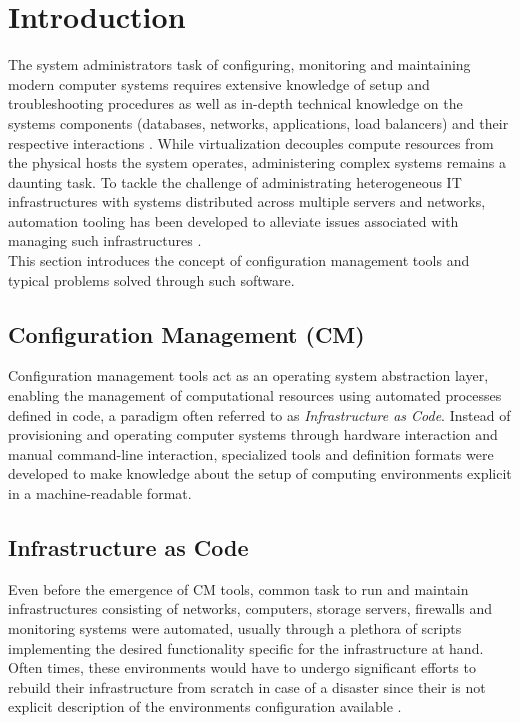 \section{Introduction}

	The system administrators task of configuring, monitoring and maintaining modern computer systems requires extensive knowledge of setup and troubleshooting procedures as well as in-depth technical knowledge on the systems components (databases, networks, applications, load balancers) and their respective interactions \cite{Barrett:2004:FSC:1031607.1031672}. While virtualization decouples compute resources from the physical hosts the system operates, administering complex systems remains a daunting task. To tackle the challenge of administrating heterogeneous IT infrastructures with systems distributed across multiple servers and networks, automation tooling has been developed to alleviate issues associated with managing such infrastructures \cite{Hintsch2016ARO}. \\ This section introduces the concept of configuration management tools and typical problems solved through such software.

\subsection{Configuration Management (CM)}

Configuration management tools act as an operating system abstraction layer, enabling the management of computational resources using automated processes defined in code, a paradigm often referred to as \textit{Infrastructure as Code}. Instead of provisioning and operating computer systems through hardware interaction and manual command-line interaction, specialized tools and definition formats were developed to make knowledge about the setup of computing environments explicit in a machine-readable format.

\subsection{Infrastructure as Code}

Even before the emergence of CM tools, common task to run and maintain infrastructures consisting of networks, computers, storage servers, firewalls and monitoring systems were automated, usually through a plethora of scripts implementing the desired functionality specific for the infrastructure at hand. Often times, these environments would have to undergo significant efforts to rebuild their infrastructure from scratch in case of a disaster since their is not explicit description of the environments configuration available \cite{Hüttermann2012}.

